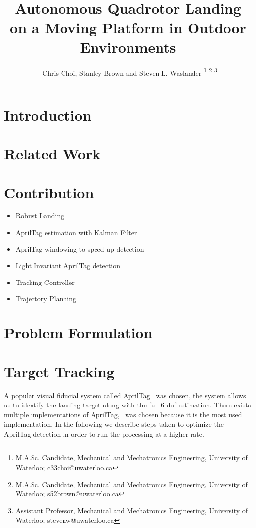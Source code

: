 \documentclass[letterpaper, 10 pt, conference]{ieeeconf}
\title{\large \textbf Autonomous Quadrotor Landing on a Moving Platform in
Outdoor Environments}
\author{\
Chris Choi\authorrefmark{1}, Stanley Brown\authorrefmark{2} and  Steven L. Waslander\authorrefmark{3}
\thanks{\superscript{*} M.A.Sc. Candidate, Mechanical and Mechatronics Engineering, University of Waterloo; c33choi@uwaterloo.ca}
\thanks{\superscript{2} M.A.Sc. Candidate, Mechanical and Mechatronics Engineering, University of Waterloo; s52brown@uwaterloo.ca}
\thanks{\superscript{\dag} Assistant Professor, Mechanical and Mechatronics Engineering, University of Waterloo; stevenw@uwaterloo.ca}
\vspace{0.5in}
}
\begin{document}
\maketitle
\thispagestyle{empty}
\pagestyle{empty}

\begin{abstract}
\end{abstract}


\section{Introduction}

\section{Related Work}


\section{Contribution}

\begin{itemize}
  \item{Robust Landing}
  \item{AprilTag estimation with Kalman Filter}
  \item{AprilTag windowing to speed up detection}
  \item{Light Invariant AprilTag detection}
  \item{Tracking Controller}
  \item{Trajectory Planning}
\end{itemize}

\section{Problem Formulation}



\section{Target Tracking}
A popular visual fiducial system called AprilTag~\cite{Olson2011} was chosen,
the system allows us to identify the landing target along with the full 6 dof
estimation. There exists multiple implementations of
AprilTag,~\cite{AprilTagMIT} was chosen because it is the most used
implementation. In the following we describe steps taken to optimize the
AprilTag detection in-order to run the processing at a higher rate.
\end{document}
